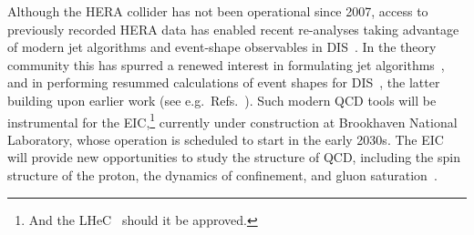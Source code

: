 Although the HERA collider has not been operational since 2007, access
to previously recorded HERA data has enabled recent re-analyses taking
advantage of modern jet algorithms and event-shape observables in
DIS~\cite{ZEUS:2023zie,H1:2023fzk,ZEUS:2024mhu,H1:2024nde,H1:2024aze,H1:2024pvu}.
%
In the theory community this has spurred a renewed interest in
formulating jet
algorithms~\cite{Arratia:2020ssx,vanBeekveld:2023chs,Caucal:2024vbv},
and in performing resummed calculations of event shapes for
DIS~\cite{Makris:2021drz,Knobbe:2023ehi,Fang:2024auf,Cao:2024ota,Ee:2025scz,vanBeekveld:2025zjh}, the latter 
building upon earlier work (see e.g.\ Refs.~\cite{Antonelli:1999kx, Dasgupta:2001eq, Dasgupta:2003iq, Kang:2013nha, Kang:2013lga, Chu:2022jgs}).
%
Such modern QCD tools will be instrumental for the EIC,\footnote{And the LHeC~\cite{LHeC:2020van} should it be approved.} currently under construction at
Brookhaven National Laboratory, whose operation is scheduled to start
in the early 2030s.  The EIC will provide new opportunities to study
the structure of QCD, including the spin structure of the proton, the
dynamics of confinement, and gluon
saturation~\cite{Accardi:2012qut,AbdulKhalek:2021gbh}.

